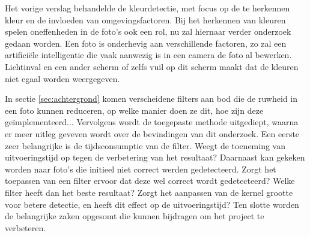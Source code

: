 Het vorige verslag behandelde de kleurdetectie, met focus op de te herkennen kleur en de invloeden van omgevingsfactoren. Bij het herkennen van kleuren spelen oneffenheden in de foto's ook een rol, nu zal hiernaar verder onderzoek gedaan worden. Een foto is onderhevig aan verschillende factoren, zo zal een artificiële intelligentie die vaak aanwezig is in een camera de foto al bewerken. Lichtinval en een ander scherm of zelfs vuil op dit scherm maakt dat de kleuren niet egaal worden weergegeven.

In sectie \ref{sec:achtergrond} komen verscheidene filters aan bod die de ruwheid in een foto kunnen reduceren, op welke manier doen ze dit, hoe zijn deze geïmplementeerd... Vervolgens wordt de toegepaste methode uitgediept, waarna er meer uitleg geveven wordt over de bevindingen van dit onderzoek. Een eerste zeer belangrijke is de tijdsconsumptie van de filter. Weegt de toeneming van uitvoeringstijd op tegen de verbetering van het resultaat? Daarnaast kan gekeken worden naar foto's die initieel niet correct werden gedetecteerd. Zorgt het toepassen van een filter ervoor dat deze wel correct wordt gedetecteerd? Welke filter heeft dan het beste resultaat? Zorgt het aanpassen van de kernel grootte voor betere detectie, en heeft dit effect op de uitvoeringstijd?  Ten slotte worden de belangrijke zaken opgesomt die kunnen bijdragen om het project te verbeteren.